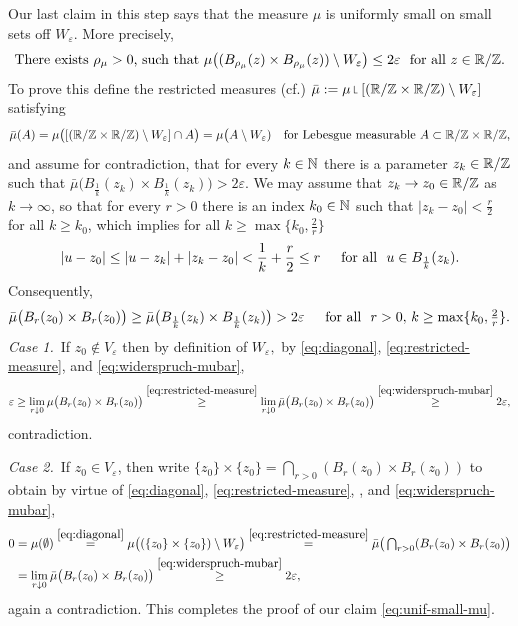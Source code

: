 Our last claim in this step says that the measure $\mu$ is uniformly
small on small sets off $W_\varepsilon$. More precisely,
\begin{equation}\label{eq:unif-small-mu}
\textnormal{There exists $\rho_\mu>0$, such that
$\mu\big((B_{\rho_\mu}(z)\times B_{\rho_\mu}(z))\setminus W_\varepsilon\big)
\le 2\varepsilon$\,\, for all $z\in\mathbb{R}/\mathbb{Z}.$}
\end{equation}
To prove this define the restricted measures 
(cf.\@ \cite[Definition 1.2]{evans-gariepy_2015}) 
$\bar{\mu}:=\mu\measurerestr [(\R/\Z\times\R/\Z)\setminus
W_\varepsilon ]$ satisfying
\begin{equation}\label{eq:restricted-measure}
\bar{\mu}(A)=\mu\big([(\R/\Z\times\R/\Z)\setminus W_\varepsilon ]\cap A\big)
=\mu\big(A\setminus W_\varepsilon)\quad%
\text{for Lebesgue measurable }
A\subset\R/\Z\times\R/\Z,
\end{equation}
and assume for contradiction, that for every $k\in\mathbb{N}$ there is
a parameter $z_k\in\mathbb{R}/\mathbb{Z}$ such that $\bar{\mu}\big(B_\frac1k (z_k)
\times B_\frac1k (z_k)\big)>2\varepsilon.$ We may assume that $z_k\to
z_0\in\mathbb{R}/\mathbb{Z}$ as $k\to\infty$, so that for every $r>0$ there is an 
index $k_0\in\mathbb{N}$ such that 
$|z_k-z_0|<\frac{r}2$ for all $k\ge k_0$, which implies for all 
$k\ge\max\{k_0,\frac2{r}\}$
$$
|u-z_0|\le |u-z_k|+|z_k-z_0|<\frac1{k}+\frac{r}2\le r\quad\,\,\,\text{for all }\,\,
u\in B_\frac1k (z_k).
$$
Consequently,
\begin{equation}\label{eq:widerspruch-mubar}
\textstyle
\bar{\mu}\big( B_r(z_0)\times B_r(z_0)   \big)
\ge\bar{\mu}\big( B_\frac1k (z_k)\times B_\frac1k (z_k)  \big)
>2\varepsilon\quad\,\,\,\text{for all }\,\, r>0,\,k\ge\max\{k_0,\frac2{r}\}.
\end{equation}
{\it Case 1.}\,
If $z_0\not\in V_\varepsilon$ then by definition of $W_\varepsilon,$
by \eqref{eq:diagonal}, \eqref{eq:restricted-measure}, and
\eqref{eq:widerspruch-mubar},
$$
\varepsilon\ge\lim_{r\downarrow 0}\mu\big(B_r(z_0)\times B_r(z_0) \big)
\overset{\eqref{eq:restricted-measure}}{\ge}
\lim_{r\downarrow 0}\bar{\mu}\big(B_r(z_0)\times B_r(z_0)\big)
\overset{\eqref{eq:widerspruch-mubar}}{\ge}2\varepsilon,
$$
contradiction.

{\it Case 2.}\,
If $z_0\in V_\varepsilon$, then write $\{z_0\}\times\{z_0\}=
\bigcap_{r>0}(B_r(z_0)\times B_r(z_0))$ to obtain by virtue
of \eqref{eq:diagonal}, \eqref{eq:restricted-measure}, 
\cite[Theorem~1.2(iv)]{evans-gariepy_2015}, and \eqref{eq:widerspruch-mubar},
\begin{align*}
0 & =
\mu(\emptyset)\overset{\eqref{eq:diagonal}}{=}
\mu\big((\{z_0\}\times\{z_0\})\setminus W_\varepsilon\big)
\overset{\eqref{eq:restricted-measure}}{=}\textstyle
\bar{\mu}\big(\bigcap_{r>0}(B_r(z_0)\times B_r(z_0)\big)\\
&
 = \lim_{r\downarrow 0}\bar{\mu}\big(B_r(z_0)\times B_r(z_0)\big)
\overset{\eqref{eq:widerspruch-mubar}}{\ge} 2\varepsilon,
\end{align*}
again a contradiction. This completes the proof of our claim
\eqref{eq:unif-small-mu}.

